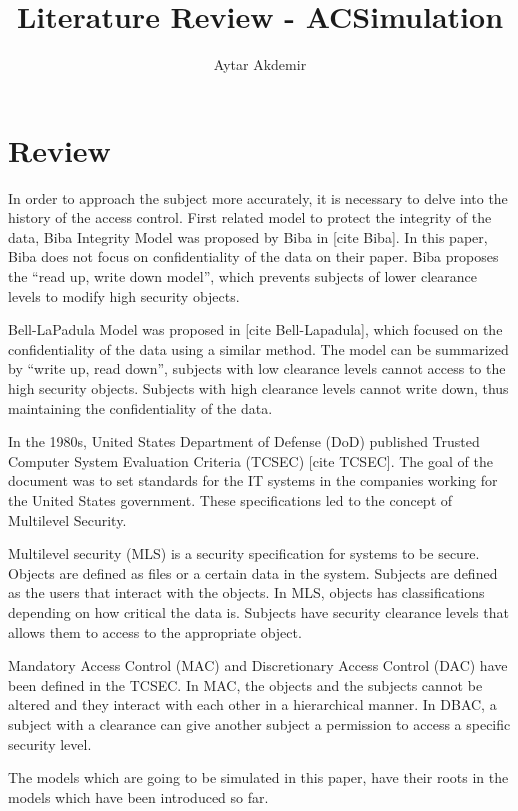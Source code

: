 \documentclass[11pt]{article} %
\title{Literature Review - ACSimulation}
\author{Aytar Akdemir}
\begin{document}
\maketitle

\section{Review}

In order to approach the subject more accurately, it is necessary to delve into the history of the access control. 
First related model to protect the integrity of the data, Biba Integrity Model was proposed by Biba in [cite Biba]. 
In this paper, Biba does not focus on confidentiality of the data on their paper. 
Biba proposes the ``read up, write down model'', which prevents subjects of lower clearance levels to modify high security objects.

Bell-LaPadula Model was proposed in [cite Bell-Lapadula], which focused on the confidentiality of the data using a similar method. 
The model can be summarized by ``write up, read down'', subjects with low clearance levels cannot access to the high security objects. 
Subjects with high clearance levels cannot write down, thus maintaining the confidentiality of the data.

In the 1980s, United States Department of Defense (DoD) published Trusted Computer System Evaluation Criteria (TCSEC) [cite TCSEC]. 
The goal of the document was to set standards for the IT systems in the companies working for the  United States government. 
These specifications led to the concept of Multilevel Security. 

Multilevel security (MLS) is a security specification for systems to be secure. 
Objects are defined as files or a certain data in the system. 
Subjects are defined as the users that interact with the objects. 
In MLS, objects has classifications depending on how critical the data is. 
Subjects have security clearance levels that allows them to access to the appropriate object.

Mandatory Access Control (MAC) and Discretionary Access Control (DAC) have been defined in the TCSEC. 
In MAC, the objects and the subjects cannot be altered and they interact with each other in a hierarchical manner. 
In DBAC, a subject with a clearance can give another subject a permission to access a specific security level.

The models which are going to be simulated in this paper, have their roots in the models which have been introduced so far.  
\end{document}
